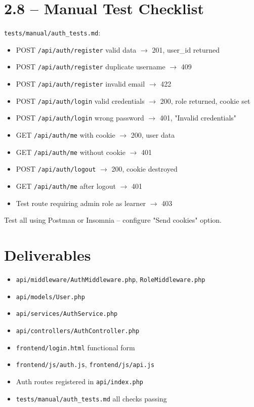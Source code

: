 \documentclass[11pt,a4paper]{report}
\newcommand{\todo}{\textcolor{helixamber}{\textbf{[ ]}}}
\newcommand{\filepath}[1]{\texttt{\small#1}}
\begin{document}
\section{2.8 -- Manual Test Checklist}

\filepath{tests/manual/auth\_tests.md}:

\begin{itemize}
    \item[\todo] POST \texttt{/api/auth/register} valid data $\rightarrow$ 201, user\_id returned
    \item[\todo] POST \texttt{/api/auth/register} duplicate username $\rightarrow$ 409
    \item[\todo] POST \texttt{/api/auth/register} invalid email $\rightarrow$ 422
    \item[\todo] POST \texttt{/api/auth/login} valid credentials $\rightarrow$ 200, role returned, cookie set
    \item[\todo] POST \texttt{/api/auth/login} wrong password $\rightarrow$ 401, "Invalid credentials"
    \item[\todo] GET \texttt{/api/auth/me} with cookie $\rightarrow$ 200, user data
    \item[\todo] GET \texttt{/api/auth/me} without cookie $\rightarrow$ 401
    \item[\todo] POST \texttt{/api/auth/logout} $\rightarrow$ 200, cookie destroyed
    \item[\todo] GET \texttt{/api/auth/me} after logout $\rightarrow$ 401
    \item[\todo] Test route requiring admin role as learner $\rightarrow$ 403
\end{itemize}

Test all using Postman or Insomnia -- configure "Send cookies" option.

\section*{Deliverables}

\begin{itemize}
    \item \filepath{api/middleware/AuthMiddleware.php}, \filepath{RoleMiddleware.php}
    \item \filepath{api/models/User.php}
    \item \filepath{api/services/AuthService.php}
    \item \filepath{api/controllers/AuthController.php}
    \item \filepath{frontend/login.html} functional form
    \item \filepath{frontend/js/auth.js}, \filepath{frontend/js/api.js}
    \item Auth routes registered in \filepath{api/index.php}
    \item \filepath{tests/manual/auth\_tests.md} all checks passing
\end{itemize}
\end{document}
